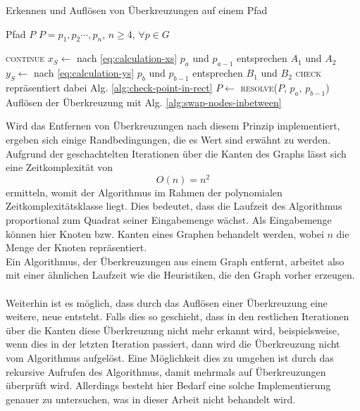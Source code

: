\begin{algorithm}
    \caption{Erkennen und Auflösen von Überkreuzungen auf einem Pfad}
    \label{alg:handle-crossover}
    \begin{algorithmic}[1]
        \Require Pfad $P$
        \Require $P=p_1,p_2\cdots,p_n$, $n \geq 4$, $\forall p \in G$
        
                    \State \textsc{continue}
                \EndIf
                \State $x_S \gets $ nach \vref{eq:calculation-xs}
                \Comment $p_a$ und $p_{a-1}$ entsprechen $A_1$ und $A_2$ 
                \State $y_S \gets $ nach \vref{eq:calculation-ys}
                \Comment $p_b$ und $p_{b-1}$ entsprechen $B_1$ und $B_2$ 
                \Comment \textsc{check} repräsentiert dabei \ac{Alg.} \vref{alg:check-point-in-rect}
                    \State $P \gets $ \textsc{resolve}($P$, $p_a$, $p_{b-1}$)
                    \Comment Auflösen der Überkreuzung mit \ac{Alg.} \vref{alg:swap-nodes-inbetween}
                \EndIf
            \EndFor
        \EndFor
    \end{algorithmic}
\end{algorithm}

Wird das Entfernen von Überkreuzungen nach diesem Prinzip implementiert, ergeben sich einige Randbedingungen, die es Wert sind erwähnt zu werden.
Aufgrund der geschachtelten Iterationen über die Kanten des Graphs lässt sich eine Zeitkomplexität von $$O(n) = n^2$$ ermitteln, womit der Algorithmus im Rahmen der polynomialen Zeitkomplexitätsklasse liegt. 
Dies bedeutet, dass die Laufzeit des Algorithmus proportional zum Quadrat seiner Eingabemenge wächst.\autocite[15]{Gurski.2010}
Als Eingabemenge können hier Knoten bzw. Kanten eines Graphen behandelt werden, wobei $n$ die Menge der Knoten repräsentiert.
\\
Ein Algorithmus, der Überkreuzungen aus einem Graph entfernt, arbeitet also mit einer ähnlichen Laufzeit wie die Heuristiken, die den Graph vorher erzeugen.
\\\\
Weiterhin ist es möglich, dass durch das Auflösen einer Überkreuzung eine weitere, neue entsteht.
Falls dies so geschieht, dass in den restlichen Iterationen über die Kanten diese Überkreuzung nicht mehr erkannt wird, beispielsweise, wenn dies in der letzten Iteration passiert, dann wird die Überkreuzung nicht vom Algorithmus aufgelöst.
Eine Möglichkeit dies zu umgehen ist durch das rekursive Aufrufen des Algorithmus, damit mehrmals auf Überkreuzungen überprüft wird.
Allerdings besteht hier Bedarf eine solche Implementierung genauer zu untersuchen, was in dieser Arbeit nicht behandelt wird.
